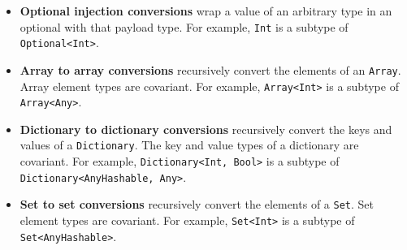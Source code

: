 \documentclass[../generics]{subfiles}
\begin{document}
\begin{itemize}
\item {}\textbf{Optional injection conversions} wrap a value of an arbitrary type in an optional with that payload type. For example, \verb|Int| is a subtype of \verb|Optional<Int>|.

\item \textbf{Array to array conversions} recursively convert the elements of an \texttt{Array}. Array element types are covariant. For example, \verb|Array<Int>| is a subtype of \verb|Array<Any>|.

\item \textbf{Dictionary to dictionary conversions} recursively convert the keys and values of a \texttt{Dictionary}. The key and value types of a dictionary are covariant. For example, \verb|Dictionary<Int, Bool>| is a subtype of \verb|Dictionary<AnyHashable, Any>|.

\item \textbf{Set to set conversions} recursively convert the elements of a \texttt{Set}. Set element types are covariant. For example, \verb|Set<Int>| is a subtype of \verb|Set<AnyHashable>|.
\end{itemize}
\end{document}
